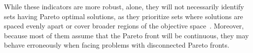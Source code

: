 \begin{itemize}
		
	\end{itemize}
	
	While these indicators are more robust, alone, they will not necessarily identify sets having Pareto optimal solutions, as they prioritize sets where solutions are spaced evenly apart or cover broader regions of the objective space~\cite{Veldhuizen1999GD}. Moreover, because most of them assume that the Pareto front will be continuous, they may behave erroneously when facing problems with disconnected Pareto fronts. %
	
